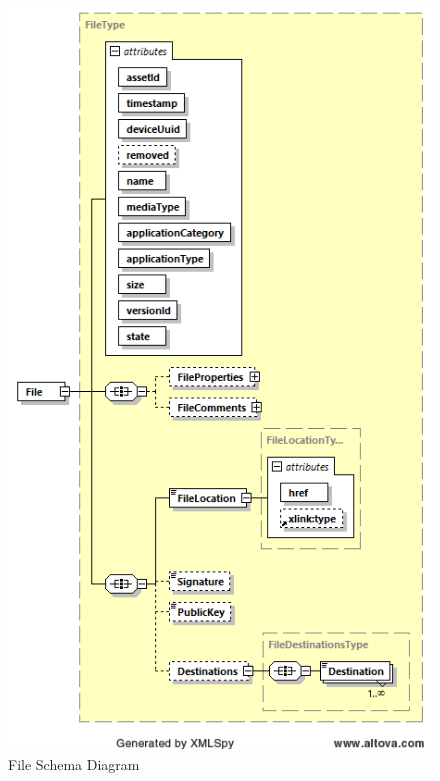 \begin{figure}[ht]
  \centering
    \includegraphics[width=1.0\textwidth]{figures/File Schema.png}
  \caption{File Schema Diagram}
  \label{fig:File Schema Diagram}
\end{figure}

\FloatBarrier
